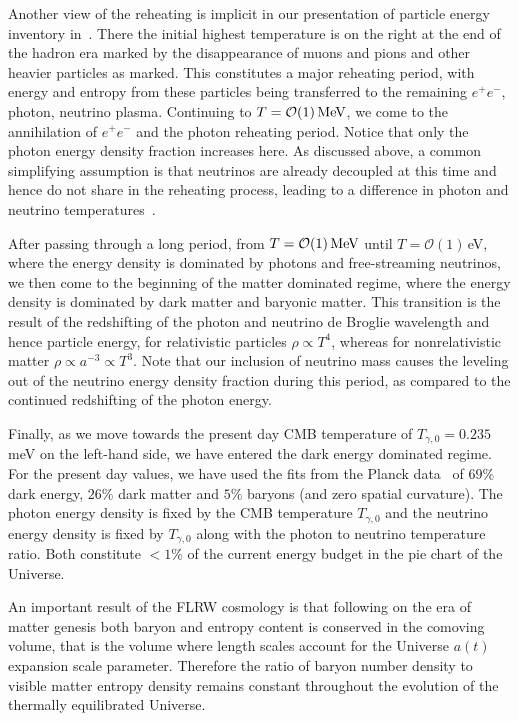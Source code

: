 Another view of the reheating is implicit in our presentation of particle energy inventory in~. There the initial highest temperature is on the right at the end of the hadron era marked by the disappearance of muons and pions and other heavier particles as marked. This constitutes a major reheating period, with energy and entropy from these particles being transferred to the remaining $e^+e^-$, photon, neutrino plasma. Continuing to $T=\mathcal{O}(1)\text{\,MeV}$, we come to the annihilation of $e^+e^-$ and the photon reheating period. Notice that only the photon energy density fraction increases here. As discussed above, a common simplifying assumption is that neutrinos are already decoupled at this time and hence do not share in the reheating process, leading to a difference in photon and neutrino temperatures~.

After passing through a long period, from $T=\mathcal{O}(1)\text{\,MeV}$ until $T=\mathcal{O}(1)$\,eV, where the energy density is dominated by photons and free-streaming neutrinos, we then come to the beginning of the matter dominated regime, where the energy density is dominated by dark matter and baryonic matter. This transition is the result of the redshifting of the photon and neutrino de Broglie wavelength and hence particle energy, for relativistic particles $\rho\propto T^4$, whereas for nonrelativistic matter $\rho\propto a^{-3}\propto T^3$. Note that our inclusion of neutrino mass causes the leveling out of the neutrino energy density fraction during this period, as compared to the continued redshifting of the photon energy.

Finally, as we move towards the present day CMB temperature of $T_{\gamma,0}=0.235$ meV on the left-hand side, we have entered the dark energy dominated regime. For the present day values, we have used the fits from the Planck data~\cite{Planck:2018vyg,Planck:2015fie,Planck:2013pxb} of $69\%$ dark energy, $26\%$ dark matter and $5\%$ baryons (and zero spatial curvature). The photon energy density is fixed by the CMB temperature $T_{\gamma,0}$ and the neutrino energy density is fixed by $T_{\gamma,0}$ along with the photon to neutrino temperature ratio. Both constitute $<1\%$ of the current energy budget in the pie chart of the Universe.


An important
result of the FLRW cosmology is that following on the era of matter genesis both baryon and entropy content is conserved in the comoving volume, that is the volume where length scales account for the Universe $a(t)$ expansion scale parameter. Therefore the ratio of baryon number density to visible matter entropy density remains constant throughout the evolution of the thermally equilibrated Universe. 

